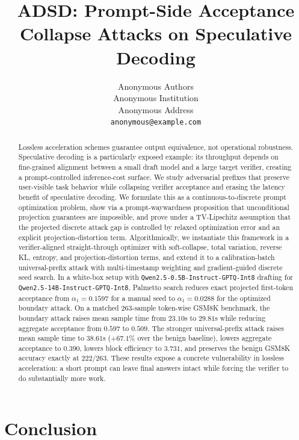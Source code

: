 \documentclass{article}
\title{ADSD: Prompt-Side Acceptance Collapse Attacks on Speculative Decoding}
\author{%
  Anonymous Authors \\
  Anonymous Institution \\
  Anonymous Address \\
  \texttt{anonymous@example.com} \\
}
\begin{document}
\maketitle

\begin{abstract}
Lossless acceleration schemes guarantee output equivalence, not operational
robustness. Speculative decoding is a particularly exposed example: its
throughput depends on fine-grained alignment between a small draft model and a
large target verifier, creating a prompt-controlled inference-cost surface. We
study adversarial prefixes that preserve user-visible task behavior while
collapsing verifier acceptance and erasing the latency benefit of speculative
decoding. We formulate this as a continuous-to-discrete prompt optimization
problem, show via a prompt-waywardness proposition that unconditional
projection guarantees are impossible, and prove under a TV-Lipschitz assumption
that the projected discrete attack gap is controlled by relaxed optimization
error and an explicit projection-distortion term. Algorithmically, we
instantiate this framework in a verifier-aligned straight-through optimizer
with soft-collapse, total variation, reverse KL, entropy, and
projection-distortion terms, and extend it to a calibration-batch
universal-prefix attack with multi-timestamp weighting and gradient-guided
discrete seed search. In a white-box setup with
\texttt{Qwen2.5-0.5B-Instruct-GPTQ-Int8} drafting for
\texttt{Qwen2.5-14B-Instruct-GPTQ-Int8}, Palmetto search reduces exact
projected first-token acceptance from $\alpha_1=0.1597$ for a manual seed to
$\alpha_1=0.0288$ for the optimized boundary attack. On a matched 263-sample
token-wise GSM8K benchmark, the boundary attack raises mean sample time from
$23.10$s to $29.81$s while reducing aggregate acceptance from $0.597$ to
$0.509$. The stronger universal-prefix attack raises mean sample time to
$38.61$s ($+67.1\%$ over the benign baseline), lowers aggregate acceptance to
$0.390$, lowers block efficiency to $3.731$, and preserves the benign GSM8K
accuracy exactly at $222/263$. These results expose a concrete vulnerability in
lossless acceleration: a short prompt can leave final answers intact while
forcing the verifier to do substantially more work.
\end{abstract}







\section{Conclusion}
\end{document}
